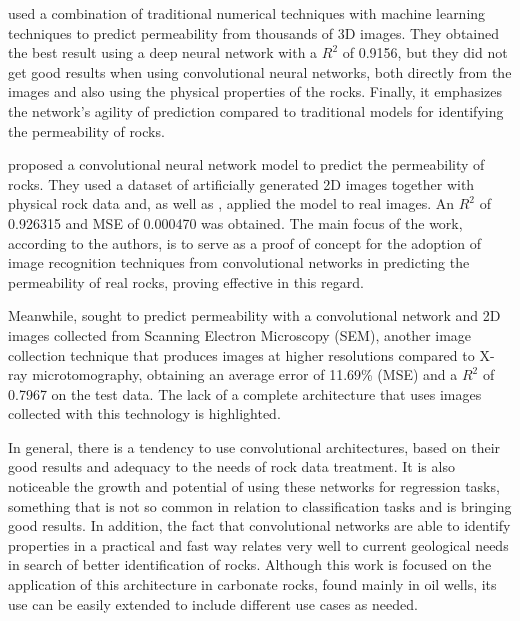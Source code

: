 \documentclass[a4paper,fleqn]{cas-sc}
\begin{document}
 used a combination of traditional numerical techniques with machine learning techniques to predict permeability from thousands of 3D images. They obtained the best result using a deep neural network with a $R^2$ of 0.9156, but they did not get good results when using convolutional neural networks, both directly from the images and also using the physical properties of the rocks. Finally, it emphasizes the network's agility of prediction compared to traditional models for identifying the permeability of rocks.

 proposed a convolutional neural network model to predict the permeability of rocks. They used a dataset of artificially generated 2D images together with physical rock data and, as well as , applied the model to real images. An $R^2$ of 0.926315 and MSE of 0.000470 was obtained. The main focus of the work, according to the authors, is to serve as a proof of concept for the adoption of image recognition techniques from convolutional networks in predicting the permeability of real rocks, proving effective in this regard.

Meanwhile,  sought to predict permeability with a convolutional network and 2D images collected from Scanning Electron Microscopy (SEM), another image collection technique that produces images at higher resolutions compared to X-ray microtomography, obtaining an average error of 11.69\% (MSE) and a $R^2$ of 0.7967 on the test data. The lack of a complete architecture that uses images collected with this technology is highlighted.

In general, there is a tendency to use convolutional architectures, based on their good results and adequacy to the needs of rock data treatment. It is also noticeable the growth and potential of using these networks for regression tasks, something that is not so common in relation to classification tasks and is bringing good results. In addition, the fact that convolutional networks are able to identify properties in a practical and fast way relates very well to current geological needs in search of better identification of rocks. Although this work is focused on the application of this architecture in carbonate rocks, found mainly in oil wells, its use can be easily extended to include different use cases as needed.

\end{document}
